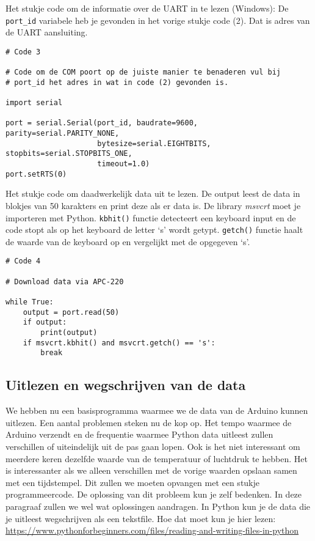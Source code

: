 Het stukje code om de informatie over de UART in te lezen (Windows):
De \verb|port_id| variabele heb je gevonden in het vorige stukje code (2).
Dat is adres van de UART aansluiting.

\begin{verbatim}
# Code 3

# Code om de COM poort op de juiste manier te benaderen vul bij
# port_id het adres in wat in code (2) gevonden is.

import serial

port = serial.Serial(port_id, baudrate=9600, parity=serial.PARITY_NONE,
                     bytesize=serial.EIGHTBITS, stopbits=serial.STOPBITS_ONE,
                     timeout=1.0)
port.setRTS(0)
\end{verbatim}

Het stukje code om daadwerkelijk data uit te lezen. De output leest de
data in blokjes van 50 karakters en print deze als er data is. De
library \emph{msvcrt} moet je importeren met Python. \verb|kbhit()|
functie detecteert een keyboard input en de code stopt als op het keyboard de
letter `s' wordt getypt. \verb|getch()| functie haalt de waarde van de keyboard
 op en vergelijkt met de opgegeven `s'.

\begin{verbatim}
# Code 4

# Download data via APC-220

while True:
    output = port.read(50)
    if output:
        print(output)
    if msvcrt.kbhit() and msvcrt.getch() == 's':
        break
\end{verbatim}


\subsection{Uitlezen en wegschrijven van de data}

We hebben nu een basisprogramma waarmee we de data van de Arduino kunnen
uitlezen. Een aantal problemen steken nu de kop op. Het tempo waarmee de
Arduino verzendt en de frequentie waarmee Python data uitleest zullen
verschillen of uiteindelijk uit de pas gaan lopen. Ook is het niet
interessant om meerdere keren dezelfde waarde van de temperatuur of
luchtdruk te hebben. Het is interessanter als we alleen verschillen met
de vorige waarden opslaan samen met een tijdstempel. Dit zullen we moeten opvangen met een stukje
programmeercode. De oplossing van dit probleem kun je zelf bedenken.
In deze paragraaf zullen we wel wat oplossingen aandragen.
In Python kun je de data die je uitleest wegschrijven als een tekstfile.
Hoe dat moet kun je hier lezen:
\url{https://www.pythonforbeginners.com/files/reading-and-writing-files-in-python}

